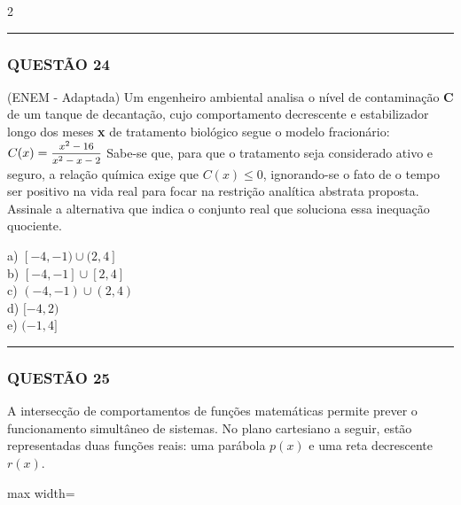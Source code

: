 \documentclass[11pt, a4paper]{article}
\begin{document}
\begin{multicols*}{2}
\vspace{0cm} \noindent\textcolor{CorLinha}{\rule{\linewidth}{0.5pt}} \vspace{-0.2cm}
\subsubsection*{QUESTÃO 24}
(ENEM - Adaptada) Um engenheiro ambiental analisa o nível de contaminação \textbf{C} de um tanque de decantação, cujo comportamento decrescente e estabilizador longo dos meses \textbf{x} de tratamento biológico segue o modelo fracionário:
$ C(x) = \mfrac{x^2 - 16}{x^2 - x - 2} $
Sabe-se que, para que o tratamento seja considerado ativo e seguro, a relação química exige que $ C(x) \le 0 $, ignorando-se o fato de o tempo ser positivo na vida real para focar na restrição analítica abstrata proposta. Assinale a alternativa que indica o conjunto real que soluciona essa inequação quociente.

a) $ [-4, -1) \cup (2, 4] $\\[0.3cm]
b) $ [-4, -1] \cup [2, 4] $\\[0.3cm]
c) $ (-4, -1) \cup (2, 4) $\\[0.3cm]
d) $ [-4, 2) $\\[0.3cm]
e) $ (-1, 4] $

\vspace{0cm} \noindent\textcolor{CorLinha}{\rule{\linewidth}{0.5pt}} \vspace{-0.2cm}
\subsubsection*{QUESTÃO 25}
A intersecção de comportamentos de funções matemáticas permite prever o funcionamento simultâneo de sistemas. No plano cartesiano a seguir, estão representadas duas funções reais: uma parábola $ p(x) $ e uma reta decrescente $ r(x) $.

\begin{center}
\begin{adjustbox}{max width=\linewidth}
\end{adjustbox}
\end{center}
\end{multicols*}
\end{document}

